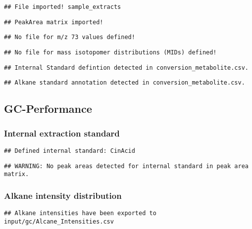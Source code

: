\documentclass[9pt,]{article}
\begin{document}
\begin{verbatim}
## File imported! sample_extracts
\end{verbatim}

\begin{verbatim}
## PeakArea matrix imported!
\end{verbatim}

\begin{verbatim}
## No file for m/z 73 values defined!
\end{verbatim}

\begin{verbatim}
## No file for mass isotopomer distributions (MIDs) defined!
\end{verbatim}

\begin{verbatim}
## Internal Standard defintion detected in conversion_metabolite.csv.
\end{verbatim}

\begin{verbatim}
## Alkane standard annotation detected in conversion_metabolite.csv.
\end{verbatim}

\subsection{GC-Performance}\label{gc-performance}

\subsubsection{Internal extraction
standard}\label{internal-extraction-standard}

\begin{verbatim}
## Defined internal standard: CinAcid
\end{verbatim}

\begin{verbatim}
## WARNING: No peak areas detected for internal standard in peak area matrix.
\end{verbatim}

\subsubsection{Alkane intensity
distribution}\label{alkane-intensity-distribution}

\begin{verbatim}
## Alkane intensities have been exported to input/gc/Alcane_Intensities.csv
\end{verbatim}
\end{document}
